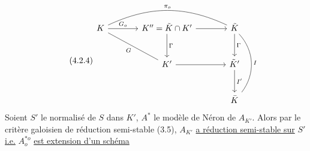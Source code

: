 \begin{equation}\tag{4.2.4}
\begin{tikzcd}[column sep=large, row sep=large]
K \arrow[r, "G_o"] \arrow[rd, dash, "G"'] \arrow[rr, bend left=25, dash, "\pi_o"] & K''=\tilde{K}\cap K' \arrow[r] \arrow[d, "\Gamma"] & \tilde{K} \arrow[d, "\Gamma"] \arrow[dd, bend left=40, dash, "I"] \\
& K' \arrow[r] & \tilde{K}' \arrow[d, "I'"] \\
& & \bar{K}
\end{tikzcd}
\end{equation}
Soient $S'$ le normalisé de $S$ dans $K'$, $A^*$ le modèle de Néron de $A_{K'}$. Alors par le critère galoisien de réduction semi-stable (3.5), $A_{K'}$ \underline{a réduction semi-stable sur} $S'$ \underline{i.e.} $A^{*o}_{o}$ \underline{est extension d'un schéma}



